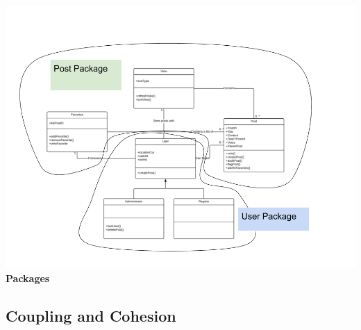 \documentclass[12pt]{article}
\begin{document}
\begin{center}
\includegraphics[scale=0.5]{img/uml/packages}\linebreak
\textbf{Packages}
  \end{center}

\subsection{Coupling and Cohesion}
\end{document}
